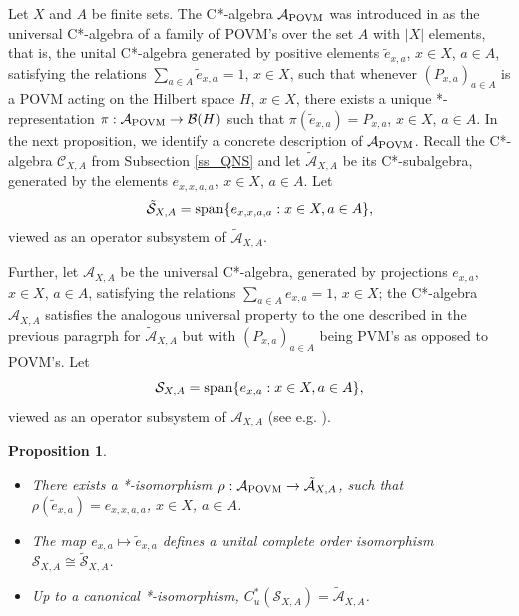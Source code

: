 \documentclass[11pt]{amsart}
\newtheorem{proposition}[theorem]{Proposition}
\theoremstyle{definition}
\newcommand{\cl}[1]{\mathcal{#1}}
\begin{document}
Let $X$ and $A$ be finite sets. 
The C*-algebra $\cl A_{\rm POVM}$ was introduced in \cite{pszz} as the 
universal C*-algebra of a family of POVM's over the set $A$ with $|X|$ elements, that is,
the unital C*-algebra generated by positive elements $\tilde{e}_{x,a}$, $x\in X$, $a\in A$, 
satisfying the relations $\sum_{a\in A} \tilde{e}_{x,a} = 1$, $x\in X$, such that 
whenever $(P_{x,a})_{a\in A}$ is a POVM acting on the Hilbert space $H$, $x\in X$,
there exists a unique *-representation $\pi : \cl A_{\rm POVM}\to \cl B(H)$ such that 
$\pi(\tilde{e}_{x,a}) = P_{x,a}$, $x\in X$, $a\in A$. 
In the next proposition, we identify a concrete description of $\cl A_{\rm POVM}$. 
Recall the C*-algebra $\cl C_{X,A}$ from Subsection \ref{ss_QNS} and 
let $\tilde{\cl A}_{X,A}$ be its C*-subalgebra, generated by the elements 
$e_{x,x,a,a}$, $x\in X$, $a\in A$. 
Let 
$$\tilde{\cl S}_{X,A} = {\rm span}\{e_{x,x,a,a} : x\in X, a\in A\},$$
viewed as an operator subsystem of $\tilde{\cl A}_{X,A}$. 

Further, let $\cl A_{X,A}$ be the universal C*-algebra, generated by projections $e_{x,a}$, $x\in X$, $a\in A$, 
satisfying the relations $\sum_{a\in A} e_{x,a} = 1$, $x\in X$;
the C*-algebra $\cl A_{X,A}$ satisfies the analogous universal 
property to the one described in the previous paragrph for 
$\tilde{\cl A}_{X,A}$ but with $(P_{x,a})_{a\in A}$ being PVM's as 
opposed to POVM's. 
Let 
\begin{equation}\label{eq_defSXA0}
\cl S_{X,A} = {\rm span}\{e_{x,a} : x\in X, a\in A\}, 
\end{equation}
viewed as an operator subsystem of $\cl A_{X,A}$ (see e.g. \cite{lmprsstw}). 



\begin{proposition}\label{p_APOVM}
\begin{itemize}
\item[(i)]
There exists a *-isomorphism $\rho : \cl A_{\rm POVM} \to \tilde{\cl A}_{X,A}$, such that 
$\rho(\tilde{e}_{x,a}) = e_{x,x,a,a}$, $x\in X$, $a\in A$. 

\item[(ii)]
The map $e_{x,a}\mapsto \tilde{e}_{x,a}$ defines a unital 
complete order isomorphism $\cl S_{X,A}\cong \tilde{\cl S}_{X,A}$.


\item[(iii)]
Up to a canonical *-isomorphism, $C^*_u(\cl S_{X,A}) = \tilde{\cl A}_{X,A}$.
\end{itemize}
\end{proposition}
\end{document}
